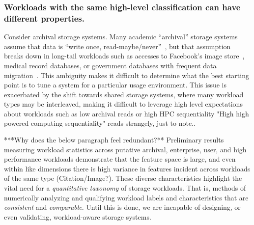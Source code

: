 


\subsubsection*{Workloads with the same high-level classification can have different properties. }
Consider archival storage systems. Many academic
``archival'' storage systems assume that data is ``write once,
read-maybe/never''~\cite{storerfast2008,venti,deepstore}, but that assumption
breaks down in long-tail workloads such as accesses to Facebook's image
store~\cite{facebook-photocache-SOSP}, medical record databases,  or government databases with frequent
data migration~\cite{ian-tos}.  
This ambiguity makes it difficult to determine
what the best starting point is to tune a system for a particular usage
environment.  %
This issue is exacerbated by the
shift towards shared storage systems, where many workload types may be
interleaved, making it difficult to leverage high level expectations about
workloads such as low archival reads or high HPC sequentiality "High high powered computing sequentiality" reads strangely, just to note.. 




***Why does the below paragraph feel redundant?**
Preliminary results measuring workload statistics across putative archival,
enterprise, user, and high performance workloads demonstrate that the feature
space is large, and even within like dimensions there is high variance in
features incident across workloads of the same type (Citation/Image?). These diverse characteristics highlight
the vital need for a \emph{quantitative taxonomy} of storage workloads. That
is, methods of numerically analyzing and qualifying workload labels and
characteristics that are \emph{consistent} and \emph{comparable}. Until this is
done, we are incapable of designing, or even validating, workload-aware storage
systems.



